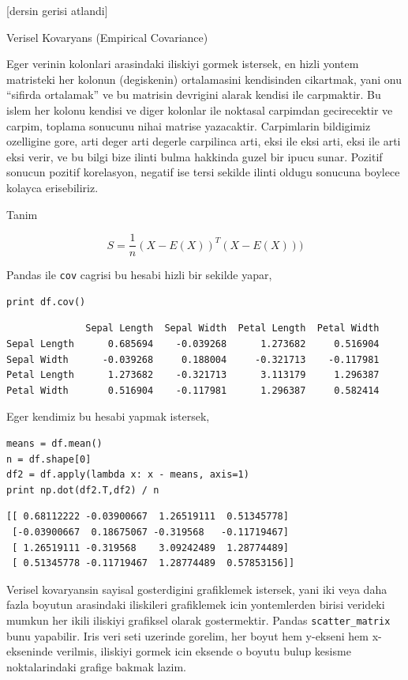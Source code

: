 \documentclass[12pt,fleqn]{article}\usepackage{../common}
\begin{document}
[dersin gerisi atlandi]

Verisel Kovaryans (Empirical Covariance) 

Eger verinin kolonlari arasindaki iliskiyi gormek istersek, en hizli yontem
matristeki her kolonun (degiskenin) ortalamasini kendisinden cikartmak,
yani onu ``sifirda ortalamak'' ve bu matrisin devrigini alarak kendisi ile
carpmaktir. Bu islem her kolonu kendisi ve diger kolonlar ile noktasal
carpimdan gecirecektir ve carpim, toplama sonucunu nihai matrise
yazacaktir. Carpimlarin bildigimiz ozelligine gore, arti deger arti degerle
carpilinca arti, eksi ile eksi arti, eksi ile arti eksi verir, ve bu bilgi
bize ilinti bulma hakkinda guzel bir ipucu sunar. Pozitif sonucun pozitif
korelasyon, negatif ise tersi sekilde ilinti oldugu sonucuna boylece
kolayca erisebiliriz.

Tanim

$$ S = \frac{1}{n} (X-E(X))^T(X-E(X))) $$

Pandas ile \verb!cov! cagrisi bu hesabi hizli bir sekilde yapar,

\begin{verbatim}
print df.cov()
\end{verbatim}

\begin{verbatim}
              Sepal Length  Sepal Width  Petal Length  Petal Width
Sepal Length      0.685694    -0.039268      1.273682     0.516904
Sepal Width      -0.039268     0.188004     -0.321713    -0.117981
Petal Length      1.273682    -0.321713      3.113179     1.296387
Petal Width       0.516904    -0.117981      1.296387     0.582414
\end{verbatim}

Eger kendimiz bu hesabi yapmak istersek,

\begin{verbatim}
means = df.mean()
n = df.shape[0]
df2 = df.apply(lambda x: x - means, axis=1)
print np.dot(df2.T,df2) / n
\end{verbatim}

\begin{verbatim}
[[ 0.68112222 -0.03900667  1.26519111  0.51345778]
 [-0.03900667  0.18675067 -0.319568   -0.11719467]
 [ 1.26519111 -0.319568    3.09242489  1.28774489]
 [ 0.51345778 -0.11719467  1.28774489  0.57853156]]
\end{verbatim}

Verisel kovaryansin sayisal gosterdigini grafiklemek istersek, yani iki
veya daha fazla boyutun arasindaki iliskileri grafiklemek icin yontemlerden
birisi verideki mumkun her ikili iliskiyi grafiksel olarak
gostermektir. Pandas \verb!scatter_matrix! bunu yapabilir. Iris veri seti
uzerinde gorelim, her boyut hem y-ekseni hem x-ekseninde verilmis, iliskiyi
gormek icin eksende o boyutu bulup kesisme noktalarindaki grafige bakmak
lazim.
\end{document}
